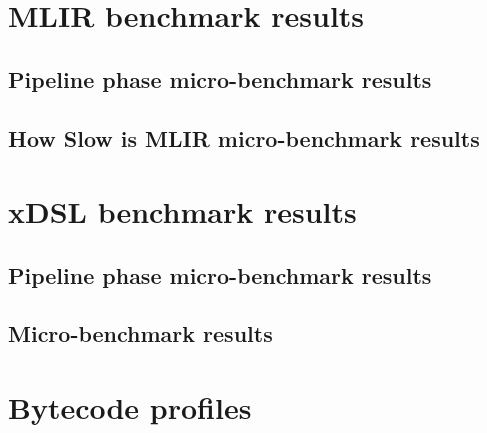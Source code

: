 \appendix


\chapter{MLIR benchmark results}
\label{chap:mlir-benchmark-results}

\section{Pipeline phase micro-benchmark results}

\section{How Slow is MLIR micro-benchmark results}


\chapter{xDSL benchmark results}
\label{chap:mlir-benchmark-results}

\section{Pipeline phase micro-benchmark results}

\section{Micro-benchmark results}




\chapter{Bytecode profiles}
\label{chap:bytecode-profiles}

